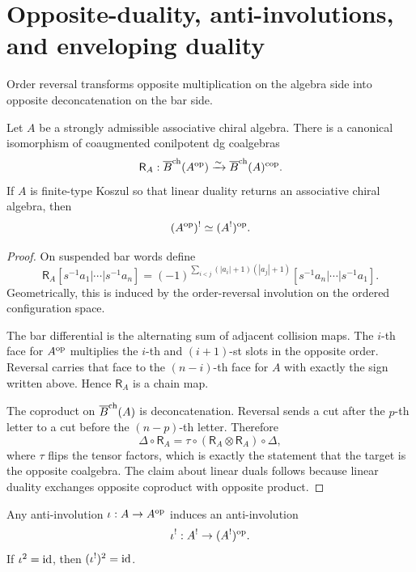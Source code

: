 \section{Opposite-duality, anti-involutions, and enveloping duality}
\label{sec:opposite}

Order reversal transforms opposite multiplication on the algebra
side into opposite deconcatenation on the bar side.

\begin{theorem}
\label{thm:opposite}
Let $A$ be a strongly admissible associative chiral algebra. There is a canonical isomorphism of
coaugmented conilpotent dg coalgebras
\[
\mathsf{R}_A:\overline{B}^{\mathrm{ch}}(A^{\mathrm{op}})\xrightarrow{\sim}\overline{B}^{\mathrm{ch}}(A)^{\mathrm{cop}}.
\]
If $A$ is finite-type Koszul so that linear duality returns an associative chiral algebra, then
\[
(A^{\mathrm{op}})^!\simeq (A^!)^{\mathrm{op}}.
\]
\end{theorem}

\begin{proof}
On suspended bar words define
\[
\mathsf{R}_A[s^{-1} a_1|\cdots|s^{-1} a_n]
=
(-1)^{\sum_{i<j}(|a_i|+1)(|a_j|+1)}
[s^{-1} a_n|\cdots|s^{-1} a_1].
\]
Geometrically, this is induced by the order-reversal involution on the ordered configuration space.

The bar differential is the alternating sum of adjacent collision maps. The $i$-th face for
$A^{\mathrm{op}}$ multiplies the $i$-th and $(i+1)$-st slots in the opposite order. Reversal carries that
face to the $(n-i)$-th face for $A$ with exactly the sign written above. Hence $\mathsf{R}_A$ is a
chain map.

The coproduct on $\overline{B}^{\mathrm{ch}}(A)$ is deconcatenation. Reversal sends a cut after the $p$-th letter to a
cut before the $(n-p)$-th letter. Therefore
\[
\Delta\circ\mathsf{R}_A
=
\tau\circ(\mathsf{R}_A\otimes\mathsf{R}_A)\circ\Delta,
\]
where $\tau$ flips the tensor factors, which is exactly the statement that the target is the
opposite coalgebra. The claim about linear duals follows because linear duality exchanges opposite
coproduct with opposite product.
\end{proof}

\begin{corollary}
\label{cor:anti}
Any anti-involution $\iota:A\to A^{\mathrm{op}}$ induces an anti-involution
\[
\iota^!:A^!\to (A^!)^{\mathrm{op}}.
\]
If $\iota^2=\mathrm{id}$, then $(\iota^!)^2=\mathrm{id}$.
\end{corollary}

